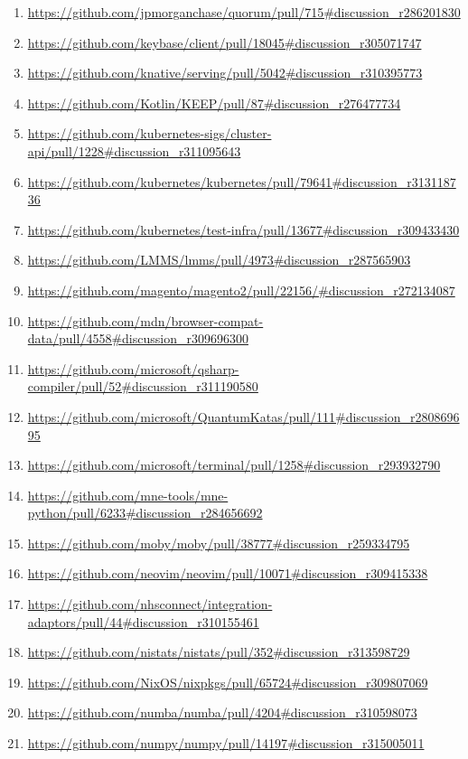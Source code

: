 {\begin{enumerate}[topsep=0pt,itemsep=-1ex,partopsep=1ex,parsep=1ex]
    \item \url{https://github.com/jpmorganchase/quorum/pull/715\#discussion_r286201830}
    \item \url{https://github.com/keybase/client/pull/18045\#discussion_r305071747}
    \item \url{https://github.com/knative/serving/pull/5042\#discussion_r310395773}
    \item \url{https://github.com/Kotlin/KEEP/pull/87\#discussion_r276477734}
    \item \url{https://github.com/kubernetes-sigs/cluster-api/pull/1228\#discussion_r311095643}
    \item \url{https://github.com/kubernetes/kubernetes/pull/79641\#discussion_r313118736}
    \item \url{https://github.com/kubernetes/test-infra/pull/13677\#discussion_r309433430}
    \item \url{https://github.com/LMMS/lmms/pull/4973\#discussion_r287565903}
    \item \url{https://github.com/magento/magento2/pull/22156/\#discussion_r272134087}
    \item \url{https://github.com/mdn/browser-compat-data/pull/4558\#discussion_r309696300}
    \item \url{https://github.com/microsoft/qsharp-compiler/pull/52\#discussion_r311190580}
    \item \url{https://github.com/microsoft/QuantumKatas/pull/111\#discussion_r280869695}
    \item \url{https://github.com/microsoft/terminal/pull/1258\#discussion_r293932790}
    \item \url{https://github.com/mne-tools/mne-python/pull/6233\#discussion_r284656692}
    \item \url{https://github.com/moby/moby/pull/38777\#discussion_r259334795}
    \item \url{https://github.com/neovim/neovim/pull/10071\#discussion_r309415338}
    \item \url{https://github.com/nhsconnect/integration-adaptors/pull/44\#discussion_r310155461}
    \item \url{https://github.com/nistats/nistats/pull/352\#discussion_r313598729}
    \item \url{https://github.com/NixOS/nixpkgs/pull/65724\#discussion_r309807069}
    \item \url{https://github.com/numba/numba/pull/4204\#discussion_r310598073}
    \item \url{https://github.com/numpy/numpy/pull/14197\#discussion_r315005011}

\end{enumerate}}
